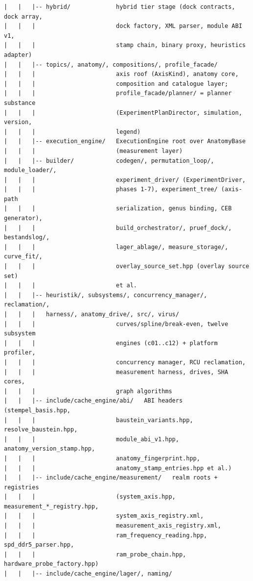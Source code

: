 {\begin{verbatim}
|   |   |-- hybrid/             hybrid tier stage (dock contracts, dock array,
|   |   |                       dock factory, XML parser, module ABI v1,
|   |   |                       stamp chain, binary proxy, heuristics adapter)
|   |   |-- topics/, anatomy/, compositions/, profile_facade/
|   |   |                       axis roof (AxisKind), anatomy core,
|   |   |                       composition and catalogue layer;
|   |   |                       profile_facade/planner/ = planner substance
|   |   |                       (ExperimentPlanDirector, simulation, version,
|   |   |                       legend)
|   |   |-- execution_engine/   ExecutionEngine root over AnatomyBase
|   |   |                       (measurement layer)
|   |   |-- builder/            codegen/, permutation_loop/, module_loader/,
|   |   |                       experiment_driver/ (ExperimentDriver,
|   |   |                       phases 1-7), experiment_tree/ (axis-path
|   |   |                       serialization, genus binding, CEB generator),
|   |   |                       build_orchestrator/, pruef_dock/, bestandslog/,
|   |   |                       lager_ablage/, measure_storage/, curve_fit/,
|   |   |                       overlay_source_set.hpp (overlay source set)
|   |   |                       et al.
|   |   |-- heuristik/, subsystems/, concurrency_manager/, reclamation/,
|   |   |   harness/, anatomy_drive/, src/, virus/
|   |   |                       curves/spline/break-even, twelve subsystem
|   |   |                       engines (c01..c12) + platform profiler,
|   |   |                       concurrency manager, RCU reclamation,
|   |   |                       measurement harness, drives, SHA cores,
|   |   |                       graph algorithms
|   |   |-- include/cache_engine/abi/   ABI headers (stempel_basis.hpp,
|   |   |                       baustein_variants.hpp, resolve_baustein.hpp,
|   |   |                       module_abi_v1.hpp, anatomy_version_stamp.hpp,
|   |   |                       anatomy_fingerprint.hpp,
|   |   |                       anatomy_stamp_entries.hpp et al.)
|   |   |-- include/cache_engine/measurement/   realm roots + registries
|   |   |                       (system_axis.hpp, measurement_*_registry.hpp,
|   |   |                       system_axis_registry.xml,
|   |   |                       measurement_axis_registry.xml,
|   |   |                       ram_frequency_reading.hpp, spd_ddr5_parser.hpp,
|   |   |                       ram_probe_chain.hpp, hardware_probe_factory.hpp)
|   |   |-- include/cache_engine/lager/, naming/

\end{verbatim}}
